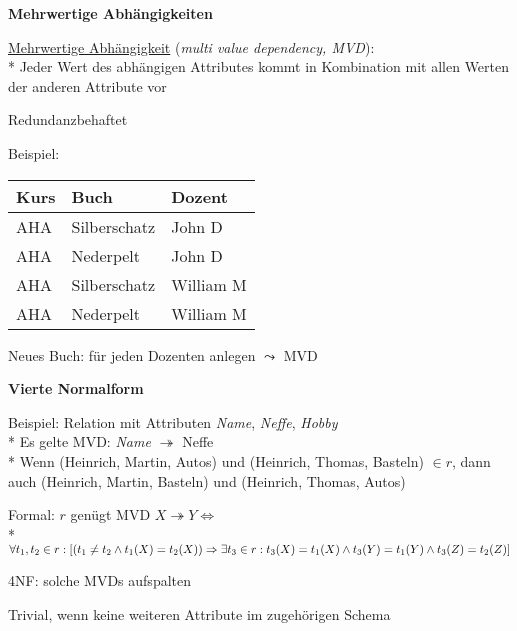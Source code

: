 \textbf{Mehrwertige Abhängigkeiten}
\begin{items}
	\item \underline{Mehrwertige Abhängigkeit} (\emph{multi value dependency, MVD}): \\*
		Jeder Wert des abhängigen Attributes kommt in Kombination mit allen Werten der anderen Attribute vor
	\item Redundanzbehaftet
	\item Beispiel:
	\begin{center}
		\begin{tabular}{|lll|}
		  \hline
		  \textbf{Kurs} & \textbf{Buch} & \textbf{Dozent} \\
		  \hline
		  AHA & Silberschatz & John D \\
		  AHA & Nederpelt & John D \\
		  AHA & Silberschatz & William M \\
		  AHA & Nederpelt & William M \\
		  \hline
		\end{tabular}
	\end{center}
	Neues Buch: für jeden Dozenten anlegen \( \leadsto \) MVD
\end{items}

\textbf{Vierte Normalform}
\begin{items}
	\item Beispiel: Relation mit Attributen \emph{Name}, \emph{Neffe}, \emph{Hobby} \\*
		Es gelte MVD: \emph{Name} \( \twoheadrightarrow \) Neffe \\*
		Wenn (Heinrich, Martin, Autos) und (Heinrich, Thomas, Basteln) 
		\( \in r \), dann auch 
		(Heinrich, Martin, Basteln) und (Heinrich, Thomas, Autos)
	\item Formal: \( r \) genügt MVD \( X \twoheadrightarrow Y \Leftrightarrow \) \\*
		\( \forall t_1, t_2 \in r: [(t_1 \neq t_2 \wedge t_1(X) = t_2(X)) \\* \Rightarrow \exists t_3 \in r: t_3(X)=t_1(X) \wedge t_3(Y)=t_1(Y) \wedge t_3(Z) = t_2(Z) ] \) 
	\item 4NF: solche MVDs aufspalten
	\item Trivial, wenn keine weiteren Attribute im zugehörigen Schema
\end{items}

